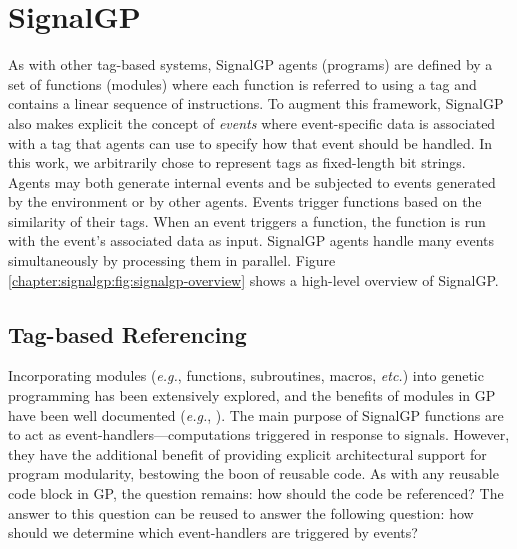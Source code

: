 \section{SignalGP}

As with other tag-based systems, 
SignalGP agents (programs) are defined by a set of functions (modules) where each function is referred to using a tag and contains a linear sequence of instructions.
To augment this framework, SignalGP also makes explicit the concept of \textit{events} where event-specific data is associated with a tag that agents can use to specify how that event should be handled.  
In this work, we arbitrarily chose to represent tags as fixed-length bit strings. 
Agents may both generate internal events and be subjected to events generated by the environment or by other agents. 
Events trigger functions based on the similarity of their tags. When an event triggers a function, the function is run with the event's associated data as input. 
SignalGP agents handle many events simultaneously by processing them in parallel. 
Figure \ref{chapter:signalgp:fig:signalgp-overview} shows a high-level overview of SignalGP. 



\subsection{Tag-based Referencing}
\label{chapter:signalgp:sec:signalgp:tag-based-referencing}

Incorporating modules (\textit{e.g.}, functions, subroutines, macros, \textit{etc.}) into genetic programming has been extensively explored, and the benefits of modules in GP have been well documented
(\textit{e.g.}, \citep{koza_genetic_1992,koza_genetic_1994,angeline_evolutionary_1992,keijzer_undirected_2005,walker_automatic_2008,roberts_evolving_2001,spector_simultaneous_1996}). 
The main purpose of SignalGP functions are to act as event-handlers---computations triggered in response to signals. However, they have the additional benefit of providing explicit architectural support for program modularity, bestowing the boon of reusable code. 
As with any reusable code block in GP, the question remains: how should the code be referenced? 
The answer to this question can be reused to answer the following question: how should we determine which event-handlers are triggered by events? 

